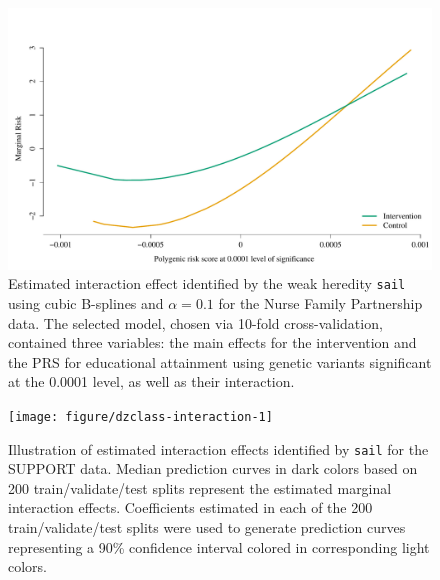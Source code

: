 \begin{knitrout}\scriptsize
	\color{fgcolor}\begin{figure}[h]
		
		{\centering \includegraphics[width=1\linewidth]{figure/PRS-intervention-interaction-1} 
			
		}
		
		\caption[Estimated interaction effect identified by the weak heredity \texttt{sail} using cubic B-splines and $\alpha=0.1$ for the Nurse Family Partnership data]{Estimated interaction effect identified by the weak heredity \texttt{sail} using cubic B-splines and $\alpha=0.1$ for the Nurse Family Partnership data. The selected model, chosen via 10-fold cross-validation, contained three variables: the main effects for the intervention and the PRS for educational attainment using genetic variants significant at the 0.0001 level, as well as their interaction.}\label{fig:PRS-intervention-interaction}
	\end{figure}
	
	
\end{knitrout}



\begin{knitrout}\scriptsize
	\color{fgcolor}\begin{figure}[h]
		
		{\centering \texttt{[image: figure/dzclass-interaction-1]} 
			
		}
		
		\caption[Illustration of estimated interaction effects identified by \texttt{sail} for the SUPPORT data]{Illustration of estimated interaction effects identified by \texttt{sail} for the SUPPORT data. Median prediction curves in dark colors based on 200 train/validate/test splits represent the estimated marginal interaction effects. Coefficients estimated in each of the 200 train/validate/test splits were used to generate prediction curves representing a 90\% confidence interval colored in corresponding light colors.}\label{fig:dzclass-interaction}
	\end{figure}
	
	
\end{knitrout}